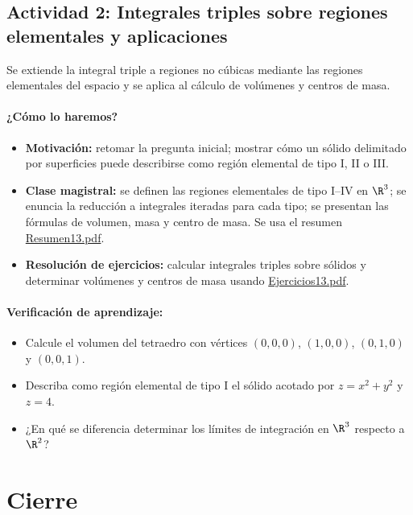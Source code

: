 \documentclass[a4,11pt]{aleph-notas}
\begin{document}
\subsection*{Actividad 2: Integrales triples sobre regiones elementales y aplicaciones}
Se extiende la integral triple a regiones no cúbicas mediante las regiones elementales del espacio y se aplica al cálculo de volúmenes y centros de masa.

\paragraph{¿Cómo lo haremos?}
\begin{itemize}[leftmargin=*]
    \item \textbf{Motivación:} retomar la pregunta inicial; mostrar cómo un sólido delimitado por superficies puede describirse como región elemental de tipo I, II o III.
    \item \textbf{Clase magistral:} se definen las regiones elementales de tipo I–IV en $\R^3$; se enuncia la reducción a integrales iteradas para cada tipo; se presentan las fórmulas de volumen, masa y centro de masa. Se usa el resumen \href{https://andres-merino.github.io/MatematicaIII-05-N0051/01Resumen/Resumen13.pdf}{Resumen13.pdf}.
    \item \textbf{Resolución de ejercicios:} calcular integrales triples sobre sólidos y determinar volúmenes y centros de masa usando \href{https://andres-merino.github.io/MatematicaIII-05-N0051/04Ejercicios/Ejercicios13.pdf}{Ejercicios13.pdf}.
\end{itemize}

\paragraph{Verificación de aprendizaje:}
\begin{itemize}[leftmargin=*]
    \item Calcule el volumen del tetraedro con vértices $(0,0,0)$, $(1,0,0)$, $(0,1,0)$ y $(0,0,1)$.
    \item Describa como región elemental de tipo I el sólido acotado por $z=x^2+y^2$ y $z=4$.
    \item ¿En qué se diferencia determinar los límites de integración en $\R^3$ respecto a $\R^2$?
\end{itemize}

\section*{Cierre}
\end{document}
